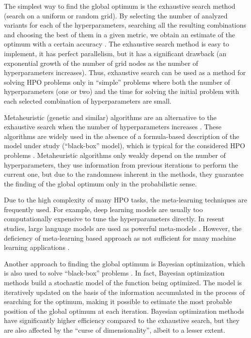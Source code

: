 \documentclass[iicol]{sn-jnl}
\theoremstyle{thmstyleone}%
\theoremstyle{thmstyletwo}%
\theoremstyle{thmstylethree}%
\begin{document}
The simplest way to find the global optimum is the exhaustive search method (search on a uniform \citep{Bao2006} or random \citep{Bergstra2012} grid). 
By selecting the number of analyzed variants for each of the hyperparameters, searching all the resulting combinations and choosing the best of them in a given metric, we obtain an estimate of the optimum with a certain accuracy \citep{Nevendra2022}. The exhaustive search method is easy to implement, it has perfect parallelism, but it has a significant drawback (an exponential growth of the number of grid nodes as the number of hyperparameters increases). Thus, exhaustive search can be used as a method for solving HPO problems only in ``simple'' problems where both the number of hyperparameters (one or two) and the time for solving the initial problem with each selected combination of hyperparameters are small. 

Metaheuristic (genetic and similar) algorithms are an alternative to the exhaustive search when the number of hyperparameters increases \citep{Opara2019}. These algorithms are widely used in the absence of a formula-based description of the model under study (``black-box'' model), which is typical for the considered HPO problems \citep{Zhou2021,Yang2022}. Metaheuristic algorithms only weakly depend on the number of hyperparameters, they use information from previous iterations to perform the current one, but due to the randomness inherent in the methods, they guarantee the finding of the global optimum only in the probabilistic sense.

Due to the high complexity of many HPO tasks, the meta-learning techniques are frequently used. For example, deep learning models \citep{doke2021survey} are usually too computationally expensive to tune the hyperparameters directly. In resent studies, large language models are used as powerful meta-models \citep{zhang2023using}. However, the deficiency of meta-learning based approach as not sufficient for many machine learning applications \citep{doke2021survey}.

Another approach to finding the global optimum is Bayesian optimization, which is also used to solve ``black-box'' problems \citep{Frazier2018,Archetti2019}. In fact, Bayesian optimization methods build a stochastic model of the function being optimized. The model is iteratively updated on the basis of the information accumulated in the process of searching for the optimum, making it possible to estimate the most probable position of the global optimum at each iteration. Bayesian optimization methods have significantly higher efficiency compared to the exhaustive search, but they are also affected by the ``curse of dimensionality'', albeit to a lesser extent. 
\end{document}

